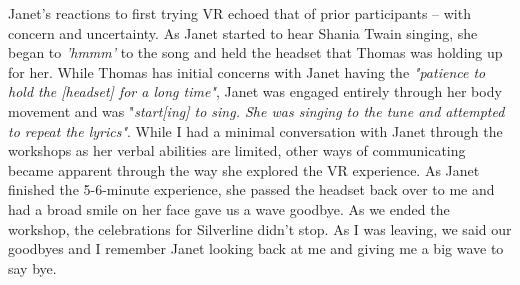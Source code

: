 Janet's reactions to first trying VR echoed that of prior participants – with concern and uncertainty. As Janet started to hear Shania Twain singing, she began to \textit{'hmmm' }to the song and held the headset that Thomas was holding up for her. While Thomas has initial concerns with Janet having the \textit{"patience to hold the [headset] for a long time"}, Janet was engaged entirely through her body movement and was "\textit{start[ing] to sing. She was singing to the tune and attempted to repeat the lyrics"}. While I had a minimal conversation with Janet through the workshops as her verbal abilities are limited, other ways of communicating became apparent through the way she explored the VR experience. As Janet finished the 5-6-minute experience, she passed the headset back over to me and had a broad smile on her face gave us a wave goodbye. As we ended the workshop, the celebrations for Silverline didn't stop. As I was leaving, we said our goodbyes and I remember Janet looking back at me and giving me a big wave to say bye.

